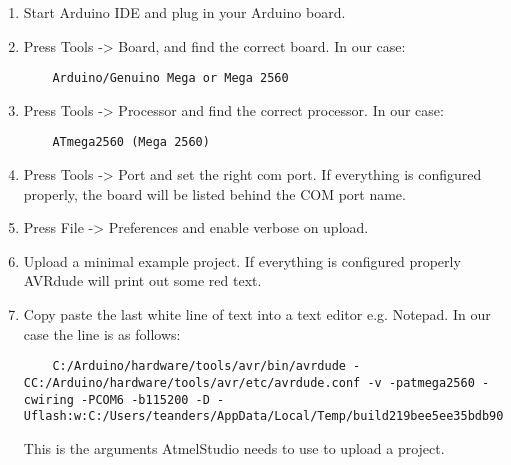 \begin{enumerate}
    \item Start Arduino IDE and plug in your Arduino board.
    \item Press Tools -> Board, and find the correct board. In our case:
    \begin{lstlisting}
    Arduino/Genuino Mega or Mega 2560
    \end{lstlisting}
    \item Press Tools -> Processor and find the correct processor. In our case:
    \begin{lstlisting}
    ATmega2560 (Mega 2560)
    \end{lstlisting}
    \item Press Tools -> Port and set the right com port. If everything is configured properly, the board will be listed behind the COM port name.
    \item Press File -> Preferences and enable verbose on upload.
    \item Upload a minimal example project. If everything is configured properly AVRdude will print out some red text.
    \item Copy paste the last white line of text into a text editor e.g. Notepad. In our case the line is as follows:
    \begin{lstlisting}
    C:/Arduino/hardware/tools/avr/bin/avrdude -CC:/Arduino/hardware/tools/avr/etc/avrdude.conf -v -patmega2560 -cwiring -PCOM6 -b115200 -D -Uflash:w:C:/Users/teanders/AppData/Local/Temp/build219bee5ee35bdb906c90832b67c0fe23.tmp/teste.ino.hex:i
    \end{lstlisting}
    This is the arguments AtmelStudio needs to use to upload a project.
\end{enumerate}

